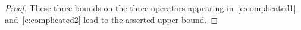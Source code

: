 \begin{proof}
These three bounds on the three operators appearing in~\eqref{e:complicated1} and~\eqref{e:complicated2} lead to the asserted upper bound.
%
\end{proof}


